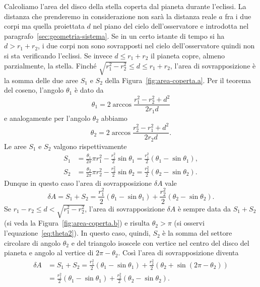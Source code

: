 Calcoliamo l'area del disco della stella coperta dal pianeta durante
l'eclissi. La distanza che prenderemo in considerazione non sarà la distanza
reale $a$ fra i due corpi ma quella proiettata $d$ nel piano del cielo
dell'osservatore e introdotta nel paragrafo~\ref{sec:geometria-sistema}. Se in
un certo istante di tempo si ha $d > r_1 + r_2$, i due corpi non sono
sovrapposti nel cielo dell'osservatore quindi non si sta verificando
l'eclissi. Se invece $d \leq r_1 + r_2$ il pianeta copre, almeno parzialmente,
la stella. Finché $\sqrt{r_1^2 - r_2^2} \leq d \leq r_1 + r_2$, l'area di
sovrapposizione è la somma delle due aree $S_1$ e $S_2$ della
Figura~\ref{fig:area-coperta.a}. Per il teorema del coseno, l'angolo $\theta_1$
è dato da
\begin{equation}
  \theta_1 = 2 \arccos \frac{r_1^2 - r_2^2 + d^2}{2r_1 d}
\end{equation}
e analogamente per l'angolo $\theta_2$ abbiamo
\begin{equation}
  \label{eq:theta2}
  \theta_2 = 2 \arccos \frac{r_2^2 - r_1^2 + d^2}{2r_2 d}.
\end{equation}
Le aree $S_1$ e $S_2$ valgono rispettivamente
\begin{subequations}
  \begin{align}
    S_1 &= \frac{\theta_1}{2\pi}\pi r_1^2 - \frac{r_1^2}{2}\sin\theta_1 =
    \frac{r_1^2}{2}(\theta_1 - \sin\theta_1), \\
    S_2 &= \frac{\theta_2}{2\pi}\pi r_2^2 - \frac{r_2^2}{2}\sin\theta_2 =
    \frac{r_2^2}{2}(\theta_2 - \sin\theta_2).
  \end{align}
\end{subequations}
Dunque in questo caso l'area di sovrapposizione $\delta A$ vale
\begin{equation}
  \delta A = S_1 + S_2 = \frac{r_1^2}{2}(\theta_1 - \sin\theta_1) +
  \frac{r_2^2}{2}(\theta_2 - \sin\theta_2).
\end{equation}
Se $r_1 - r_2 \leq d < \sqrt{r_1^2 - r_2^2}$, l'area di sovrapposizione
$\delta A$ è sempre data da $S_1 + S_2$ (si veda la
Figura~\ref{fig:area-coperta.b}) e risulta $\theta_2 > \pi$ (si osservi
l'equazione~\eqref{eq:theta2}). In questo caso, quindi, $S_2$ è la somma del
settore circolare di angolo $\theta_2$ e del triangolo isoscele con vertice nel
centro del disco del pianeta e angolo al vertice di $2\pi - \theta_2$. Così
l'area di sovrapposizione diventa
\begin{equation}
  \begin{split}
    \delta A &= S_1 + S_2 = \frac{r_1^2}{2}(\theta_1 - \sin\theta_1) +
    \frac{r_2^2}{2}(\theta_2 + \sin(2\pi -\theta_2)) \\
    &= \frac{r_1^2}{2}(\theta_1 - \sin\theta_1) + \frac{r_2^2}{2}(\theta_2 -
    \sin\theta_2).
  \end{split}
\end{equation}
